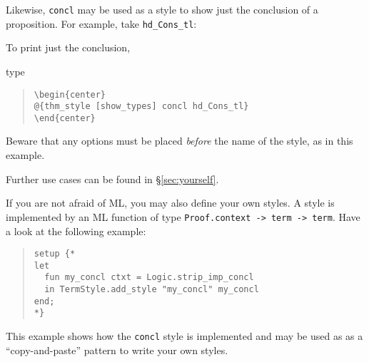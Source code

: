 \begin{isabellebody}
\begin{isamarkuptext}
  Likewise, \verb!concl! may be used as a style to show just the
  conclusion of a proposition. For example, take \verb!hd_Cons_tl!:
  \begin{center}
  \end{center}
  To print just the conclusion,
  \begin{center}
  \end{center}
  type
  \begin{quote}
    \verb!\begin{center}!\\
    \verb!@!\verb!{thm_style [show_types] concl hd_Cons_tl}!\\
    \verb!\end{center}!
  \end{quote}
  Beware that any options must be placed \emph{before}
  the name of the style, as in this example.

  Further use cases can be found in \S\ref{sec:yourself}.

  If you are not afraid of ML, you may also define your own styles.
  A style is implemented by an ML function of type
  \verb!Proof.context -> term -> term!.
  Have a look at the following example:%
\end{isamarkuptext}%
\isamarkuptrue%
%
\isadelimML
%
\endisadelimML
%
\isatagML
%
\endisatagML
{\isafoldML}%
%
\isadelimML
%
\endisadelimML
%
\begin{isamarkuptext}%
\begin{quote}
    \verb!setup {!\verb!*!\\
    \verb!let!\\
    \verb!  fun my_concl ctxt = Logic.strip_imp_concl!\\
    \verb!  in TermStyle.add_style "my_concl" my_concl!\\
    \verb!end;!\\
    \verb!*!\verb!}!\\
  \end{quote}

  \noindent
  This example shows how the \verb!concl! style is implemented
  and may be used as as a ``copy-and-paste'' pattern to write your own styles.


\end{isamarkuptext}
\end{isabellebody}
